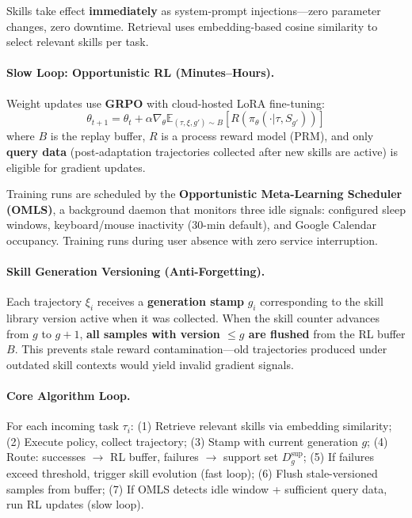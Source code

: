 \documentclass[11pt]{article}
\begin{document}
Skills take effect \textbf{immediately} as system-prompt injections---zero parameter changes, zero downtime.
Retrieval uses embedding-based cosine similarity to select relevant skills per task.

\paragraph{Slow Loop: Opportunistic RL (Minutes--Hours).}
Weight updates use \textbf{GRPO} with cloud-hosted LoRA fine-tuning:
\[
\theta_{t+1} = \theta_t + \alpha \nabla_\theta \mathbb{E}_{(\tau, \xi, g') \sim B}\left[R\!\left(\pi_\theta(\cdot|\tau, S_{g'})\right)\right]
\]
where $B$ is the replay buffer, $R$ is a process reward model (PRM), and only \textbf{query data} (post-adaptation trajectories collected after new skills are active) is eligible for gradient updates.

Training runs are scheduled by the \textbf{Opportunistic Meta-Learning Scheduler (OMLS)}, a background daemon that monitors three idle signals: configured sleep windows, keyboard/mouse inactivity (30-min default), and Google Calendar occupancy.
Training runs during user absence with zero service interruption.

\paragraph{Skill Generation Versioning (Anti-Forgetting).}
Each trajectory $\xi_i$ receives a \textbf{generation stamp} $g_i$ corresponding to the skill library version active when it was collected.
When the skill counter advances from $g$ to $g+1$, \textbf{all samples with version $\leq g$ are flushed} from the RL buffer $B$.
This prevents stale reward contamination---old trajectories produced under outdated skill contexts would yield invalid gradient signals.

\paragraph{Core Algorithm Loop.}
For each incoming task $\tau_i$:
(1) Retrieve relevant skills via embedding similarity;
(2) Execute policy, collect trajectory;
(3) Stamp with current generation $g$;
(4) Route: successes $\rightarrow$ RL buffer, failures $\rightarrow$ support set $D^{\mathrm{sup}}_g$;
(5) If failures exceed threshold, trigger skill evolution (fast loop);
(6) Flush stale-versioned samples from buffer;
(7) If OMLS detects idle window + sufficient query data, run RL updates (slow loop).
\end{document}
